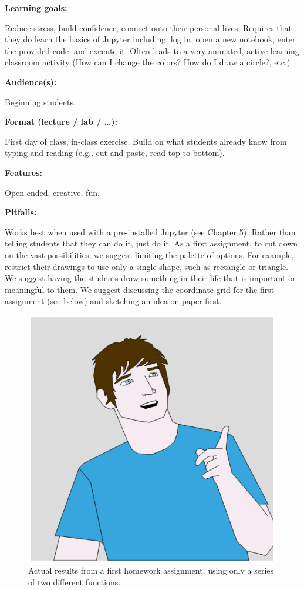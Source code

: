 \documentclass[]{book}
\begin{document}
\textbf{Learning goals:}

Reduce stress, build confidence, connect onto their personal lives.
Requires that they do learn the basics of Jupyter including: log in,
open a new notebook, enter the provided code, and execute it. Often
leads to a very animated, active learning classroom activity (How can I
change the colors? How do I draw a circle?, etc.)

\textbf{Audience(s):}

Beginning students.

\textbf{Format (lecture / lab / \ldots{}):}

First day of class, in-class exercise. Build on what students already
know from typing and reading (e.g., cut and paste, read top-to-bottom).

\textbf{Features:}

Open ended, creative, fun.

\textbf{Pitfalls:}

Works best when used with a pre-installed Jupyter (see Chapter 5).
Rather than telling students that they can do it, just do it. As a first
assignment, to cut down on the vast possibilities, we suggest limiting
the palette of options. For example, restrict their drawings to use only
a single shape, such as rectangle or triangle. We suggest having the
students draw something in their life that is important or meaningful to
them. We suggest discussing the coordinate grid for the first assignment
(see below) and sketching an idea on paper first.

\begin{figure}
\centering
\includegraphics{images/ebrose.png}
\caption{Actual results from a first homework assignment, using only a
series of two different functions.}
\end{figure}
\end{document}
